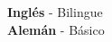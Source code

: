 

\begin{cventries}

    \begin{flushleft}
        \textnormal{{\bfseries Inglés} - Bilingue \\}
        \textnormal{{\bfseries Alemán} - Básico}
    \end{flushleft}

\end{cventries}
